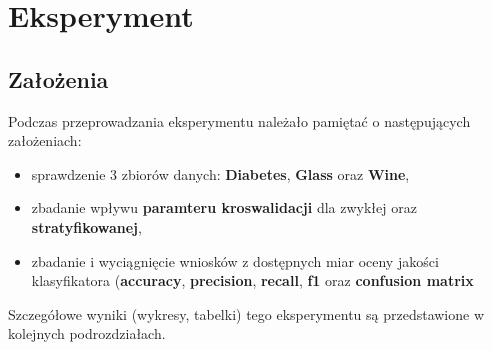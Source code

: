 \section{Eksperyment}
    \subsection{Założenia}
    Podczas przeprowadzania eksperymentu należało pamiętać o następujących założeniach:
    \begin{itemize}
        \item{sprawdzenie 3 zbiorów danych: \textbf{Diabetes}, \textbf{Glass} oraz \textbf{Wine},}
        \item{zbadanie wpływu \textbf{paramteru kroswalidacji} dla zwykłej oraz \textbf{stratyfikowanej},}
        \item{zbadanie i wyciągnięcie wniosków z dostępnych miar oceny jakości klasyfikatora
              (\textbf{accuracy}, \textbf{precision}, \textbf{recall}, \textbf{f1} oraz \textbf{confusion matrix}}
    \end{itemize}
    Szczegółowe wyniki (wykresy, tabelki) tego eksperymentu są przedstawione w kolejnych podrozdziałach.

    
